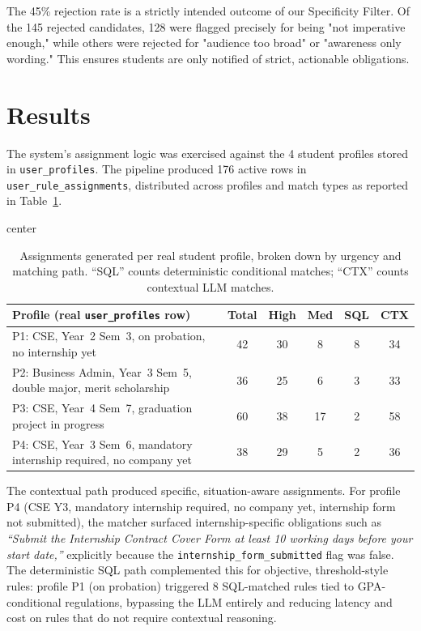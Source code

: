 \documentclass[a4paper,12pt]{article}
\begin{document}
The 45\% rejection rate is a strictly intended outcome of our Specificity Filter. Of the 145 rejected candidates, 128 were flagged precisely for being "not imperative enough," while others were rejected for "audience too broad" or "awareness only wording." This ensures students are only notified of strict, actionable obligations.

\section{Results}
The system's assignment logic was exercised against the 4 student profiles stored in \texttt{user\_profiles}. The pipeline produced 176 active rows in \texttt{user\_rule\_assignments}, distributed across profiles and match types as reported in Table~\ref{tab:assignment_results}.

\begin{table}[H]
    \centering
    \begin{adjustbox}{center}
        \begin{tabular}{p{6.2cm} c c c c c}
            \toprule
            \textbf{Profile (real \texttt{user\_profiles} row)} & \textbf{Total} & \textbf{High} & \textbf{Med} & \textbf{SQL} & \textbf{CTX} \\ \midrule
            P1: CSE, Year~2 Sem~3, on probation, no internship yet & 42 & 30 & 8 & 8 & 34 \\
            P2: Business Admin, Year~3 Sem~5, double major, merit scholarship & 36 & 25 & 6 & 3 & 33 \\
            P3: CSE, Year~4 Sem~7, graduation project in progress & 60 & 38 & 17 & 2 & 58 \\
            P4: CSE, Year~3 Sem~6, mandatory internship required, no company yet & 38 & 29 & 5 & 2 & 36 \\
            \bottomrule
        \end{tabular}
    \end{adjustbox}
    \caption{Assignments generated per real student profile, broken down by urgency and matching path. ``SQL'' counts deterministic conditional matches; ``CTX'' counts contextual LLM matches.}
    \label{tab:assignment_results}
\end{table}

The contextual path produced specific, situation-aware assignments. For profile P4 (CSE Y3, mandatory internship required, no company yet, internship form not submitted), the matcher surfaced internship-specific obligations such as \emph{``Submit the Internship Contract Cover Form at least 10 working days before your start date,''} explicitly because the \texttt{internship\_form\_submitted} flag was false. The deterministic SQL path complemented this for objective, threshold-style rules: profile P1 (on probation) triggered 8 SQL-matched rules tied to GPA-conditional regulations, bypassing the LLM entirely and reducing latency and cost on rules that do not require contextual reasoning.
\end{document}
